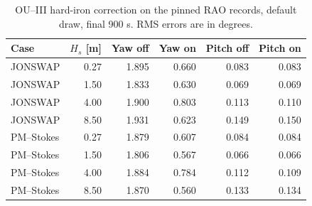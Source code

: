 \begin{table}[t]\centering
\caption{OU--III hard-iron correction on the pinned RAO records, default draw,
final 900 s. RMS errors are in degrees.}
\label{tab:mag-hi-yaw}\footnotesize
\begin{tabular}{@{}lrrrrr@{}}\toprule
Case & $H_s$ [m] & Yaw off & Yaw on & Pitch off & Pitch on \\
\midrule
JONSWAP & 0.27 & 1.895 & 0.660 & 0.083 & 0.083 \\
JONSWAP & 1.50 & 1.833 & 0.630 & 0.069 & 0.069 \\
JONSWAP & 4.00 & 1.900 & 0.803 & 0.113 & 0.110 \\
JONSWAP & 8.50 & 1.931 & 0.623 & 0.149 & 0.150 \\
PM--Stokes & 0.27 & 1.879 & 0.607 & 0.084 & 0.084 \\
PM--Stokes & 1.50 & 1.806 & 0.567 & 0.066 & 0.066 \\
PM--Stokes & 4.00 & 1.884 & 0.784 & 0.112 & 0.109 \\
PM--Stokes & 8.50 & 1.870 & 0.560 & 0.133 & 0.134 \\
\bottomrule\end{tabular}\end{table}
